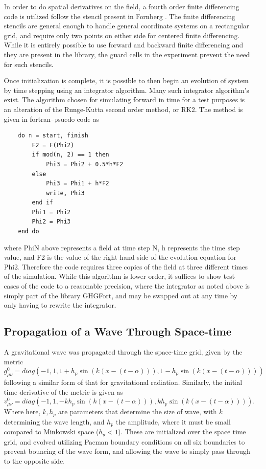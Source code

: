 \documentclass[11pt]{article}
\numberwithin{equation}{section}
\begin{document}
In order to do spatial derivatives on the field, a fourth order finite differencing code is utilized follow the stencil present in Fornberg \cite{fornberg}. The finite differencing stencils are general enough to handle general coordinate systems on a rectangular grid, and require only two points on either side for centered finite differencing. While it is entirely possible to use forward and backward finite differencing and they are present in the library, the guard cells in the experiment prevent the need for such stencils. 

Once initialization is complete, it is possible to then begin an evolution of system by time stepping using an integrator algorithm. Many such integrator algorithm's exist. The algorithm chosen for simulating forward in time for a test purposes is an alteration of the Runge-Kutta second order method, or RK2. The method is given in fortran--psuedo code as
\begin{verbatim}
    do n = start, finish
        F2 = F(Phi2)
        if mod(n, 2) == 1 then
            Phi3 = Phi2 + 0.5*h*F2
        else
            Phi3 = Phi1 + h*F2
            write, Phi3
        end if
        Phi1 = Phi2
        Phi2 = Phi3
    end do
\end{verbatim}
where PhiN above represents a field at time step N, h represents the time step value, and F2 is the value of the right hand side of the evolution equation for Phi2. Therefore the code requires three copies of the field at three different times of the simulation.   
While this algorithm is lower order, it suffices to show test cases of the code to a reasonable precision, where the integrator as noted above is simply part of the library GHGFort, and may be swapped out at any time by only having to rewrite the integrator.


\subsection{Propagation of a Wave Through Space-time}
A gravitational wave was propagated through the space-time grid, given by the metric
\begin{equation}\label{initcondg}
    g^0_{\mu\nu} = diag(-1, 1, 1 + h_{p} \sin{(k(x - (t - \alpha)))}, 1 - h_{p} \sin{(k(x - (t - \alpha)))})
\end{equation}
following a similar form of that for gravitational radiation. Similarly, the initial time derivative of the metric is given as
\begin{equation}\label{initcondv}
    v^0_{\mu\nu} = diag(-1, 1, -k h_{p} \sin{(k(x - (t - \alpha)))}, k h_{p} \sin{(k(x - (t - \alpha)))}).
\end{equation}
Where here, $k, h_{p}$ are parameters that determine the size of wave, with $k$ determining the wave length, and $h_p$ the amplitude, where it must be small compared to Minkowski space ($h_p < 1$). These are initialized over the space time grid, and evolved  utilizing Pacman boundary conditions on all six boundaries to prevent bouncing of the wave form, and allowing the wave to simply pass through to the opposite side. 
\end{document}
